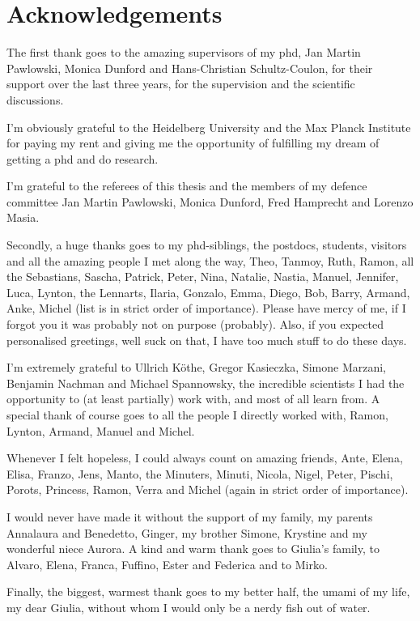 \chapter{Acknowledgements}\label{chap:acknowledgements}
\enlargethispage{2ex}
\vspace*{-2pt}
\thispagestyle{empty}

The first thank goes to the amazing supervisors of my phd,  Jan Martin Pawlowski, Monica Dunford and Hans-Christian Schultz-Coulon, for their support over the last three years, for the supervision and the scientific discussions.

\medskip

I'm obviously grateful to the Heidelberg University and the Max Planck Institute for paying my rent and giving me the opportunity of fulfilling my dream of getting a phd and do research.

\medskip

I'm grateful to the referees of this thesis and the members of my defence committee Jan Martin Pawlowski, Monica Dunford, Fred Hamprecht and Lorenzo Masia.

\medskip

Secondly, a huge thanks goes to my phd-siblings, the postdocs, students, visitors and all the amazing people I met along the way, Theo, Tanmoy, Ruth, Ramon, all the Sebastians, Sascha, Patrick, Peter, Nina, Natalie, Nastia, Manuel, Jennifer, Luca, Lynton, the Lennarts, Ilaria, Gonzalo, Emma, Diego, Bob, Barry, Armand, Anke, Michel (list is in strict order of importance). Please have mercy of me, if I forgot you it was probably not on purpose (probably). Also, if you expected personalised greetings, well suck on that, I have too much stuff to do these days.

\medskip

I'm extremely grateful to Ullrich Köthe, Gregor Kasieczka, Simone Marzani, Benjamin Nachman and Michael Spannowsky, the incredible scientists I had the opportunity to (at least partially) work with, and most of all learn from. A special thank of course goes to all the people I directly worked with, Ramon, Lynton, Armand, Manuel and Michel.


\medskip

Whenever I felt hopeless, I could always count on amazing friends, Ante, Elena, Elisa, Franzo, Jens, Manto, the Minuters, Minuti, Nicola, Nigel, Peter, Pischi, Porots, Princess, Ramon, Verra and Michel (again in strict order of importance).

\medskip

I would never have made it without the support of my family, my parents Annalaura and Benedetto, Ginger, my brother Simone, Krystine and my wonderful niece Aurora. A kind and warm thank goes to Giulia's family, to Alvaro, Elena, Franca, Fuffino, Ester and Federica and to Mirko.

\medskip

Finally, the biggest, warmest thank goes to my better half, the umami of my life, my dear Giulia, without whom I would only be a nerdy fish out of water.

